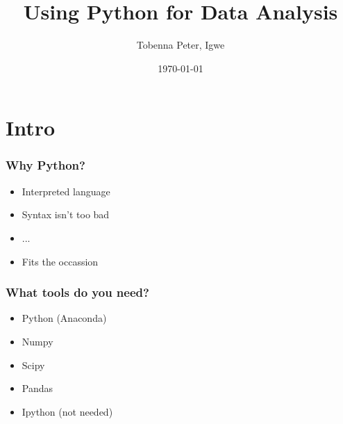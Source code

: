 \documentclass{beamer}
\title{Using Python for Data Analysis}
\author[Tobenna P. Igwe]{Tobenna Peter, Igwe}
\date[Apr 2015]
{\today}
\begin{document}
    \begin{frame}
        \titlepage
    \end{frame}
    
    \section{Intro}
    
    \begin{frame}
        \frametitle{Why Python?}
        \begin{itemize}
            \item Interpreted language
            \item Syntax isn't too bad
            \item ...
            \item Fits the occassion
        \end{itemize}
    \end{frame}
    
    \begin{frame}
        \frametitle{What tools do you need?}
        \begin{itemize}
            \item Python (Anaconda)
            \item Numpy
            \item Scipy
            \item Pandas
            \item Ipython (not needed)
        \end{itemize}
    \end{frame}
\end{document}
